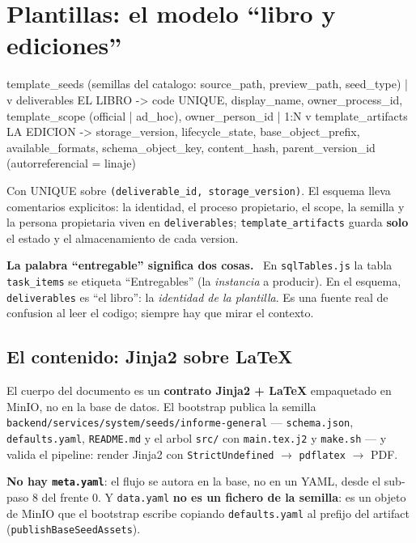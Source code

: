 \documentclass[11pt,a4paper,oneside]{report}
\newenvironment{aviso}[1][Aviso]{%
  \par\medskip
  \colorlet{shadecolor}{orange!14}%
  \begin{shaded}\noindent\textbf{\color{orange!45!black}#1.}\ \ignorespaces}%
  {\end{shaded}\par\medskip}
\newcommand{\rt}[1]{\texttt{#1}}
\begin{document}
\section{Plantillas: el modelo ``libro y ediciones''}

\begin{diagrama}
template_seeds       (semillas del catalogo: source_path, preview_path, seed_type)
      |
      v
deliverables         EL LIBRO    -> code UNIQUE, display_name, owner_process_id,
                                    template_scope (official | ad_hoc), owner_person_id
      |  1:N
      v
template_artifacts   LA EDICION  -> storage_version, lifecycle_state, base_object_prefix,
                                    available_formats, schema_object_key, content_hash,
                                    parent_version_id (autorreferencial = linaje)
\end{diagrama}

Con UNIQUE sobre \rt{(deliverable\_id, storage\_version)}. El esquema lleva comentarios
explicitos: la identidad, el proceso propietario, el scope, la semilla y la persona propietaria
viven en \rt{deliverables}; \rt{template\_artifacts} guarda \textbf{solo} el estado y el
almacenamiento de cada version.

\begin{aviso}[La palabra ``entregable'' significa dos cosas]
En \rt{sqlTables.js} la tabla \rt{task\_items} se etiqueta ``Entregables'' (la \emph{instancia}
a producir). En el esquema, \rt{deliverables} es ``el libro'': la \emph{identidad de la
plantilla}. Es una fuente real de confusion al leer el codigo; siempre hay que mirar el
contexto.
\end{aviso}

\subsection{El contenido: Jinja2 sobre LaTeX}

El cuerpo del documento es un \textbf{contrato Jinja2 + LaTeX} empaquetado en MinIO, no en la
base de datos. El bootstrap publica la semilla \rt{backend/services/system/seeds/informe-general}
--- \rt{schema.json}, \rt{defaults.yaml}, \rt{README.md} y el arbol \rt{src/} con
\rt{main.tex.j2} y \rt{make.sh} --- y valida el pipeline: render Jinja2 con
\rt{StrictUndefined} $\rightarrow$ \rt{pdflatex} $\rightarrow$ PDF.

\textbf{No hay \rt{meta.yaml}}: el flujo se autora en la base, no en un YAML, desde el sub-paso
8 del frente 0. Y \rt{data.yaml} \textbf{no es un fichero de la semilla}: es un objeto de MinIO
que el bootstrap escribe copiando \rt{defaults.yaml} al prefijo del artifact
(\rt{publishBaseSeedAssets}).
\end{document}
